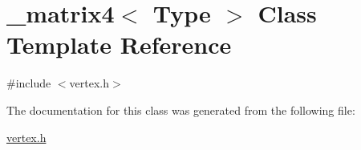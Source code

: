 \hypertarget{class__matrix4}{\section{\+\_\+matrix4$<$ Type $>$ Class Template Reference}
\label{class__matrix4}
}


{\ttfamily \#include $<$vertex.\+h$>$}



The documentation for this class was generated from the following file\+:\begin{DoxyCompactItemize}
\item 
\hyperlink{vertex_8h}{vertex.\+h}\end{DoxyCompactItemize}
